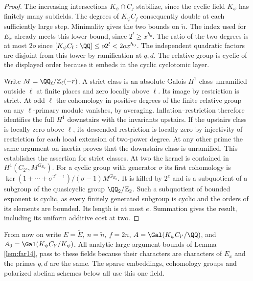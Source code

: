 \documentclass[a4paper,11pt]{article}
\theoremstyle{definition}
\theoremstyle{remark}
\newcommand{\ZZ}{\mathbb Z}\newcommand{\ord}{\operatorname{ord}}
\numberwithin{equation}{section}
\begin{document}
\begin{proof}
The increasing intersections \(K_\psi\cap C_j\) stabilize, since the
cyclic field \(K_\psi\) has finitely many subfields. The degrees of
\(K_\psi C_j\) consequently double at each sufficiently large step.
Minimality gives the two bounds on \(\widetilde n\). The index used
for \(E_x\) already meets this lower bound, since \(2^l\ge x^{h_0}\).
The ratio of the two degrees is at most \(2o\) since
\([K_\psi C_l:\QQ]\le o2^l<2o x^{h_0}\).
The independent quadratic factors are disjoint from this tower
by ramification at \(q,d\). The relative group is cyclic of the
displayed order because it embeds in the cyclic cyclotomic layer.

Write \(M=\QQ_\ell/\ZZ_\ell(-r)\). A strict class is an absolute
Galois \(H^1\)-class unramified outside \(\ell\) at finite places
and zero locally above \(\ell\). Its image by restriction is strict.
At odd \(\ell\) the cohomology in positive degrees of the finite
relative group on any \(\ell\)-primary module vanishes, by averaging.
Inflation--restriction therefore identifies the full \(H^1\) downstairs
with the invariants upstairs. If the upstairs class is locally zero
above \(\ell\), its descended restriction is locally zero by injectivity
of restriction for each local extension of two-power degree. At any
other prime the same argument on inertia proves that the downstairs
class is unramified. This establishes the assertion for strict classes.
At two the kernel is contained in \(H^1(C_{2^e},M^{G_{E_x}})\).
For a cyclic group with generator \(\sigma\) its first cohomology is
\(\ker(1+\cdots+\sigma^{2^e-1})/(\sigma-1)M^{G_{E_x}}\).
It is killed by \(2^e\) and is a subquotient of a subgroup of the
quasicyclic group \(\QQ_2/\ZZ_2\). Such a subquotient of bounded
exponent is cyclic, as every finitely generated subgroup is cyclic
and the orders of its elements are bounded. Its length is at most
\(e\). Summation gives the result, including its uniform additive
cost at two.
\end{proof}

From now on write \(E=\widetilde E,\ n=\widetilde n,\ f=2n\),
\(A=\Gal(K_\psi C_{l'}/\QQ)\), and \(A_0=\Gal(K_\psi C_{l'}/K_\psi)\).
All analytic large-argument bounds of Lemma \ref{lem:far14}, pass to
these fields because their characters are characters of \(E_x\) and
the primes \(q,d\) are the same. The sparse embeddings, cohomology
groups and polarized abelian schemes below all use this one field.
\end{document}
